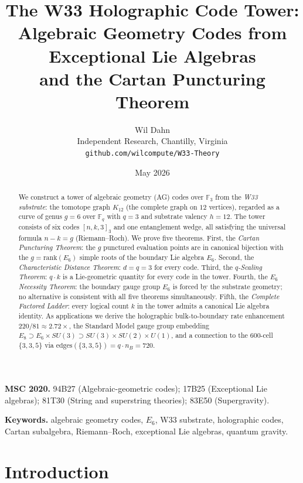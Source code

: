 \documentclass[12pt]{article}
\title{The W33 Holographic Code Tower:\\[4pt]
\large Algebraic Geometry Codes from Exceptional Lie Algebras\\
and the Cartan Puncturing Theorem}
\author{Wil Dahn\\[4pt]
\small Independent Research, Chantilly, Virginia\\[2pt]
\small \texttt{github.com/wilcompute/W33-Theory}}
\date{May 2026}
\newcommand{\F}{\mathbb{F}}
\newcommand{\rank}{\mathrm{rank}}
\begin{document}
\maketitle

\begin{abstract}
We construct a tower of algebraic geometry (AG) codes over $\F_3$
from the \emph{W33 substrate}: the tomotope graph $K_{12}$
(the complete graph on $12$ vertices), regarded as a curve of genus $g=6$
over $\F_q$ with $q=3$ and substrate valency $h=12$.
The tower consists of six codes $[n,k,3]_3$ and one entanglement wedge,
all satisfying the universal formula $n-k=g$ (Riemann--Roch).
We prove five theorems.
First, the \emph{Cartan Puncturing Theorem}: the $g$ punctured evaluation
points are in canonical bijection with the $g = \rank(E_6)$ simple roots
of the boundary Lie algebra $E_6$.
Second, the \emph{Characteristic Distance Theorem}: $d = q = 3$ for every code.
Third, the \emph{$q$-Scaling Theorem}: $q \cdot k$ is a Lie-geometric quantity
for every code in the tower.
Fourth, the \emph{$E_6$ Necessity Theorem}: the boundary gauge group $E_6$
is forced by the substrate geometry; no alternative is consistent with
all five theorems simultaneously.
Fifth, the \emph{Complete Factored Ladder}: every logical count $k$ in the tower
admits a canonical Lie algebra identity.
As applications we derive the holographic bulk-to-boundary rate enhancement
$220/81 \approx 2.72\times$, the Standard Model gauge group embedding
$E_8 \supset E_6 \times SU(3) \supset SU(3) \times SU(2) \times U(1)$,
and a connection to the $600$-cell $\{3,3,5\}$ via
$\text{edges}(\{3,3,5\}) = q \cdot n_B = 720$.
\end{abstract}

\tableofcontents

\bigskip
\noindent\textbf{MSC 2020.} 94B27 (Algebraic-geometric codes);
17B25 (Exceptional Lie algebras); 81T30 (String and superstring theories);
83E50 (Supergravity).

\medskip
\noindent\textbf{Keywords.} algebraic geometry codes, $E_6$, W33 substrate,
holographic codes, Cartan subalgebra, Riemann--Roch,
exceptional Lie algebras, quantum gravity.

\newpage

\section{Introduction}
\end{document}
